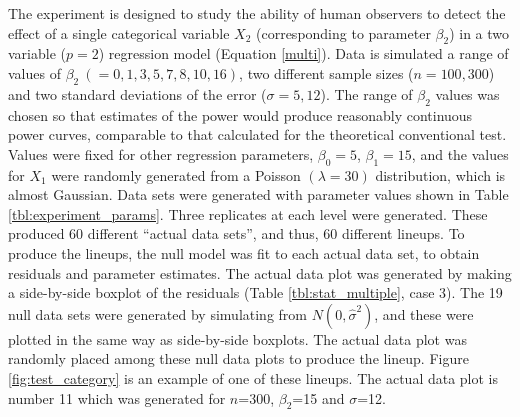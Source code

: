 \documentclass{article}
\begin{document}
The experiment is designed to study the ability of human observers to detect the effect of a single categorical variable $X_2$ (corresponding to parameter $\beta_2$) in a two variable ($p=2$) regression model (Equation \ref{multi}). Data is simulated a range of values of $\beta_2~ (=0, 1, 3, 5, 7, 8, 10, 16)$, two different sample sizes ($n=100, 300$) and two standard deviations of the error ($\sigma=5, 12$). The range of $\beta_2$ values was chosen so that estimates of the power would produce reasonably continuous power curves, comparable to that calculated for the theoretical conventional test. Values were fixed for other regression parameters, $\beta_0 = 5$,  $\beta_1=15$, and the values for $X_1$ were randomly generated from a Poisson $(\lambda=30)$ distribution, which is almost Gaussian. Data sets were generated with parameter values shown in Table \ref{tbl:experiment_params}. Three replicates at each level were generated. These produced 60 different ``actual data sets'', and thus, 60 different lineups. To produce the lineups, the null model was fit to each actual data set, to obtain residuals and parameter estimates. The actual data plot was generated by making a side-by-side boxplot of the residuals (Table \ref{tbl:stat_multiple}, case 3). The 19 null data sets were generated by simulating from  $N(0, {\hat{\sigma}}^2)$, and these were plotted in the same way as side-by-side boxplots. The actual data plot was randomly placed among these null data plots to produce the lineup. Figure \ref{fig:test_category} is an example of one of these lineups. The actual data plot is number 11 which was generated for $n$=300, $\beta_2$=15 and $\sigma$=12.  

\end{document}
